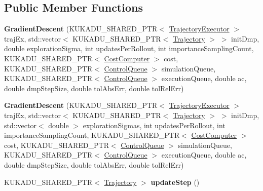 \subsection*{Public Member Functions}
\begin{DoxyCompactItemize}
\item 
\hypertarget{classkukadu_1_1GradientDescent_a8d139ea3df9ad0f8d3db34a4f8d96ff0}{{\bfseries Gradient\-Descent} (K\-U\-K\-A\-D\-U\-\_\-\-S\-H\-A\-R\-E\-D\-\_\-\-P\-T\-R$<$ \hyperlink{classkukadu_1_1TrajectoryExecutor}{Trajectory\-Executor} $>$ traj\-Ex, std\-::vector$<$ K\-U\-K\-A\-D\-U\-\_\-\-S\-H\-A\-R\-E\-D\-\_\-\-P\-T\-R$<$ \hyperlink{classkukadu_1_1Trajectory}{Trajectory} $>$ $>$ init\-Dmp, double exploration\-Sigma, int updates\-Per\-Rollout, int importance\-Sampling\-Count, K\-U\-K\-A\-D\-U\-\_\-\-S\-H\-A\-R\-E\-D\-\_\-\-P\-T\-R$<$ \hyperlink{classkukadu_1_1CostComputer}{Cost\-Computer} $>$ cost, K\-U\-K\-A\-D\-U\-\_\-\-S\-H\-A\-R\-E\-D\-\_\-\-P\-T\-R$<$ \hyperlink{classkukadu_1_1ControlQueue}{Control\-Queue} $>$ simulation\-Queue, K\-U\-K\-A\-D\-U\-\_\-\-S\-H\-A\-R\-E\-D\-\_\-\-P\-T\-R$<$ \hyperlink{classkukadu_1_1ControlQueue}{Control\-Queue} $>$ execution\-Queue, double ac, double dmp\-Step\-Size, double tol\-Abs\-Err, double tol\-Rel\-Err)}\label{classkukadu_1_1GradientDescent_a8d139ea3df9ad0f8d3db34a4f8d96ff0}

\item 
\hypertarget{classkukadu_1_1GradientDescent_aff09fe5b91da1579522a19b859173d1e}{{\bfseries Gradient\-Descent} (K\-U\-K\-A\-D\-U\-\_\-\-S\-H\-A\-R\-E\-D\-\_\-\-P\-T\-R$<$ \hyperlink{classkukadu_1_1TrajectoryExecutor}{Trajectory\-Executor} $>$ traj\-Ex, std\-::vector$<$ K\-U\-K\-A\-D\-U\-\_\-\-S\-H\-A\-R\-E\-D\-\_\-\-P\-T\-R$<$ \hyperlink{classkukadu_1_1Trajectory}{Trajectory} $>$ $>$ init\-Dmp, std\-::vector$<$ double $>$ exploration\-Sigmas, int updates\-Per\-Rollout, int importance\-Sampling\-Count, K\-U\-K\-A\-D\-U\-\_\-\-S\-H\-A\-R\-E\-D\-\_\-\-P\-T\-R$<$ \hyperlink{classkukadu_1_1CostComputer}{Cost\-Computer} $>$ cost, K\-U\-K\-A\-D\-U\-\_\-\-S\-H\-A\-R\-E\-D\-\_\-\-P\-T\-R$<$ \hyperlink{classkukadu_1_1ControlQueue}{Control\-Queue} $>$ simulation\-Queue, K\-U\-K\-A\-D\-U\-\_\-\-S\-H\-A\-R\-E\-D\-\_\-\-P\-T\-R$<$ \hyperlink{classkukadu_1_1ControlQueue}{Control\-Queue} $>$ execution\-Queue, double ac, double dmp\-Step\-Size, double tol\-Abs\-Err, double tol\-Rel\-Err)}\label{classkukadu_1_1GradientDescent_aff09fe5b91da1579522a19b859173d1e}

\item 
\hypertarget{classkukadu_1_1GradientDescent_aa7238397f55b06abb5255afd327c8402}{K\-U\-K\-A\-D\-U\-\_\-\-S\-H\-A\-R\-E\-D\-\_\-\-P\-T\-R$<$ \hyperlink{classkukadu_1_1Trajectory}{Trajectory} $>$ {\bfseries update\-Step} ()}\label{classkukadu_1_1GradientDescent_aa7238397f55b06abb5255afd327c8402}


\end{DoxyCompactItemize}
